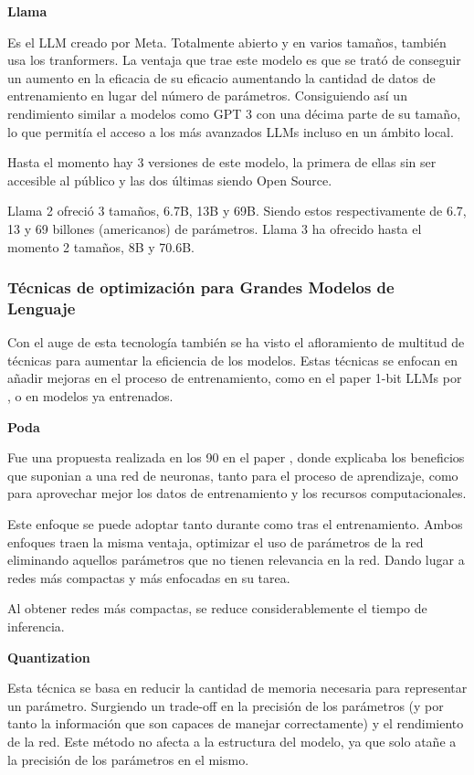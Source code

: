 \textbf{Llama}

Es el LLM creado por Meta. Totalmente abierto y en varios tamaños, también usa los tranformers. La ventaja que trae este modelo es que se trató de conseguir un aumento en la eficacia de su eficacio aumentando la cantidad de datos de entrenamiento en lugar del número de parámetros. Consiguiendo así un rendimiento similar a modelos como GPT 3 con una décima parte de su tamaño, lo que permitía el acceso a los más avanzados LLMs incluso en un ámbito local.

Hasta el momento hay 3 versiones de este modelo, la primera de ellas sin ser accesible al público y las dos últimas siendo Open Source.

Llama 2 ofreció 3 tamaños, 6.7B, 13B y 69B. Siendo estos respectivamente de 6.7, 13 y 69 billones (americanos) de parámetros.
Llama 3 ha ofrecido hasta el momento 2 tamaños, 8B y 70.6B.

\subsubsection{Técnicas de optimización para Grandes Modelos de Lenguaje}

Con el auge de esta tecnología también se ha visto el afloramiento de multitud de técnicas para aumentar la eficiencia de los modelos. Estas técnicas se enfocan en añadir mejoras en el proceso de entrenamiento, como en el paper 1-bit LLMs por \cite{ma2024era}, o en modelos ya entrenados.

\textbf{Poda}

Fue una propuesta realizada en los 90 en el paper \cite{lecun1989optimal}, donde explicaba los beneficios que suponian a una red de neuronas, tanto para el proceso de aprendizaje, como para aprovechar mejor los datos de entrenamiento y los recursos computacionales.

Este enfoque se puede adoptar tanto durante como tras el entrenamiento. Ambos enfoques traen la misma ventaja, optimizar el uso de parámetros de la red eliminando aquellos parámetros que no tienen relevancia en la red. Dando lugar a redes más compactas y más enfocadas en su tarea.

Al obtener redes más compactas, se reduce considerablemente el tiempo de inferencia.

\textbf{Quantization}

Esta técnica se basa en reducir la cantidad de memoria necesaria para representar un parámetro.  Surgiendo un trade-off en la precisión de los parámetros (y por tanto la información que son capaces de manejar correctamente) y el rendimiento de la red. Este método no afecta a la estructura del modelo, ya que solo atañe a la precisión de los parámetros en el mismo.


